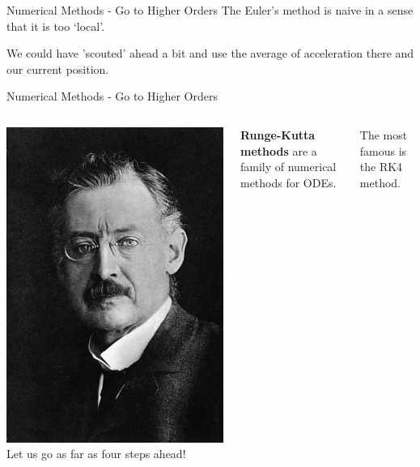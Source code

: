 \documentclass{beamer}
\begin{document}
\begin{frame}{Numerical Methods - Go to Higher Orders}
    The Euler's method is naive in a sense that it is too `local'.

    \vspace{0.5cm}

    We could have 'scouted' ahead a bit and use the average of acceleration there and our current position.
\end{frame}


\begin{frame}{Numerical Methods - Go to Higher Orders}
    \begin{columns}
        \centering
        \includegraphics[width=\textwidth]{asset/runge.jpg}
        \centering
        Let us go as far as four steps ahead!

        \vspace{0.5cm}

        \textbf{Runge-Kutta methods} are a family of numerical methods for ODEs.

        \vspace{0.5cm}

        The most famous is the RK4 method.
    \end{columns}

\end{frame}
\end{document}
